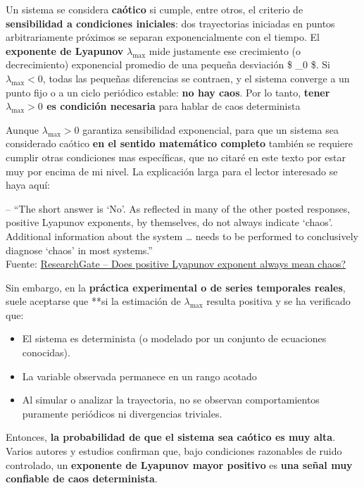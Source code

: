 \documentclass[
  10pt,
  a4paper,
  DIV=11,
  numbers=noendperiod,
  open=any]{scrreprt}
\providecommand{\tightlist}{%
  \setlength{\itemsep}{0pt}\setlength{\parskip}{0pt}}
\numberwithin{equation}{chapter}
\numberwithin{equation}{chapter}
\renewcommand{\[}{\begin{equation}}
\renewcommand{\]}{\end{equation}}
\begin{document}
Un sistema se considera \textbf{caótico} si cumple, entre otros, el
criterio de \textbf{sensibilidad a condiciones iniciales}: dos
trayectorias iniciadas en puntos arbitrariamente próximos se separan
exponencialmente con el tiempo. El \textbf{exponente de Lyapunov}
\(\lambda_{\max}\) mide justamente ese crecimiento (o decrecimiento)
exponencial promedio de una pequeña desviación \$ \delta\_0 \$. Si
\(\lambda_{\max} < 0\), todas las pequeñas diferencias se contraen, y el
sistema converge a un punto fijo o a un ciclo periódico estable:
\textbf{no hay caos}. Por lo tanto, \textbf{tener \(\lambda_{\max} > 0\)
es condición necesaria} para hablar de caos determinista

Aunque \(\lambda_{\max} > 0\) garantiza sensibilidad exponencial, para
que un sistema sea considerado caótico \textbf{en el sentido matemático
completo} también se requiere cumplir otras condiciones mas específicas,
que no citaré en este texto por estar muy por encima de mi nivel. La
explicación larga para el lector interesado se haya aquí:

-- ``The short answer is `No'. As reflected in many of the other posted
responses, positive Lyapunov exponents, by themselves, do not always
indicate `chaos'. Additional information about the system \ldots{} needs
to be performed to conclusively diagnose `chaos' in most systems.''\\
Fuente:
\href{https://www.researchgate.net/post/Does-positive-Lyapunov-exponent-always-mean-chaos}{ResearchGate
-- Does positive Lyapunov exponent always mean chaos?}

Sin embargo, en la \textbf{práctica experimental o de series temporales
reales}, suele aceptarse que **si la estimación de \(\lambda_{\max}\)
resulta positiva y se ha verificado que:

\begin{itemize}
\tightlist
\item
  El sistema es determinista (o modelado por un conjunto de ecuaciones
  conocidas).\\
\item
  La variable observada permanece en un rango acotado
\item
  Al simular o analizar la trayectoria, no se observan comportamientos
  puramente periódicos ni divergencias triviales.
\end{itemize}

Entonces, \textbf{la probabilidad de que el sistema sea caótico es muy
alta}. Varios autores y estudios confirman que, bajo condiciones
razonables de ruido controlado, un \textbf{exponente de Lyapunov mayor
positivo} es \textbf{una señal muy confiable de caos determinista}.
\end{document}
